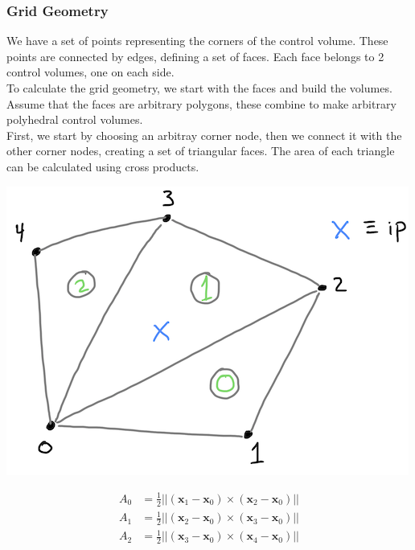 \documentclass[11pt]{article}
\begin{document}
\subsubsection{Grid Geometry}
\label{sec:orgb743cfa}
We have a set of points representing the corners of the control volume. These points are connected by
edges, defining a set of faces. Each face belongs to 2 control volumes, one on each side.\\

To calculate the grid geometry, we start with the faces and build the volumes. Assume that the faces are
arbitrary polygons, these combine to make arbitrary polyhedral control volumes.\\

First, we start by choosing an arbitray corner node, then we connect it with the other corner nodes,
creating a set of triangular faces. The area of each triangle can be calculated using cross products.\\

\begin{center}
\includegraphics[scale=1.5]{../pic/SubFaces.png}
\end{center}


\begin{equation*}
\begin{aligned}
A_0 &= \frac{1}{2} || (\textbf{x}_1 - \textbf{x}_0) \times (\textbf{x}_2 - \textbf{x}_0) ||\\
A_1 &= \frac{1}{2} || (\textbf{x}_2 - \textbf{x}_0) \times (\textbf{x}_3 - \textbf{x}_0) ||\\
A_2 &= \frac{1}{2} || (\textbf{x}_3 - \textbf{x}_0) \times (\textbf{x}_4 - \textbf{x}_0) ||
\end{aligned}
\end{equation*}    
\end{document}
